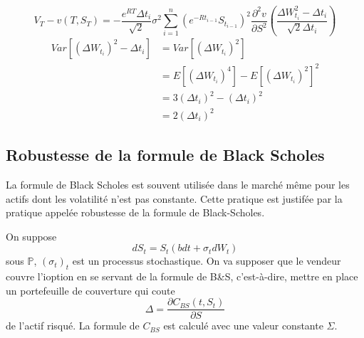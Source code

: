 \documentclass{article}
\theoremstyle{plain}
\theoremstyle{definition}
\begin{document}
\begin{equation}
V_T-v(T,S_T)=-\frac{e^{RT}\Delta t_i}{\sqrt{2}}\sigma^2\sum_{i=1}^n (e^{-Rt_{i-1}}S_{t_{i-1}})^2\frac{\partial^2 v}{\partial S^2}(\frac{\Delta W_{t_i}^2-\Delta t_i}{\sqrt{2}\Delta t_i})
\end{equation}
\begin{equation}
\begin{split}
Var[(\Delta W_{t_i})^2-\Delta t_i]&=Var[(\Delta W_{t_i})^2]\\
&=E[(\Delta W_{t_i})^4]-E[(\Delta W_{t_i})^2]^2\\
&=3(\Delta t_i)^2-(\Delta t_i)^2\\
&=2(\Delta t_i)^2
\end{split}
\end{equation}

\subsection{Robustesse de la formule de Black Scholes}
La formule de Black Scholes est souvent utilis\'ee dans le march\'e m\^eme pour les actifs dont les volatilit\'e n'est pas constante. Cette pratique est justif\'ee par la pratique appel\'ee robustesse de la formule de Black-Scholes.

On suppose 
\begin{equation}
dS_t=S_t (bdt+\sigma_t dW_t)
\end{equation}
sous $\mathbb{P}$, $(\sigma_t)_t$ est un processus stochastique. On va supposer que le vendeur couvre l'ioption en se servant de la formule de B\&S, c'est-\`a-dire, mettre en place un portefeuille de couverture qui coute
\begin{equation}
\Delta=\frac{\partial C_{BS}(t,S_t)}{\partial S}
\end{equation}
de l'actif risqu\'e. La formule de $C_{BS}$ est calcul\'e avec une valeur constante $\Sigma$.
\end{document}
